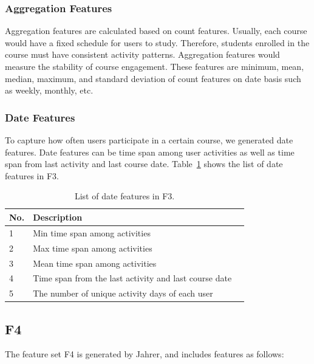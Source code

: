 \subsubsection{Aggregation Features}
Aggregation features are calculated based on count features. Usually, each course would have a fixed schedule for users to study. Therefore, students enrolled in the course must have consistent activity patterns.  Aggregation features would measure the stability of course engagement.  These features are minimum, mean, median, maximum, and standard deviation of count features on date basis such as weekly, monthly, etc.

\subsubsection{Date Features}
To capture how often users participate in a certain course, we generated date features. Date features can be time span among user activities as well as time span from last activity and last course date. Table~\ref{tb:tnfeature3} shows the list of date features in F3. 

\begin{center}
	\begin{table}[ht]
		\begin{minipage}{0.5 \textwidth}
			{
				\small
				\hfill{}
				\begin{tabular}{|l|l|l|}
					\hline
					\textbf{No.}	&\textbf{Description}\tabularnewline \hline
					1 			& Min time span among activities \tabularnewline
					2 			& Max time span among activities \tabularnewline
					3 			& Mean time span among activities \tabularnewline
					4 			& Time span from the last activity and last course date \tabularnewline
					5 			& The number of unique activity days of each user \tabularnewline
					\hline
				\end{tabular}
			}
			\hfill{}
			\caption{List of date features in F3.}
			\label{tb:tnfeature3}
		\end{minipage}
	\end{table}
\end{center}

\subsection{F4}
The feature set F4 is generated by Jahrer, and includes features as follows:


